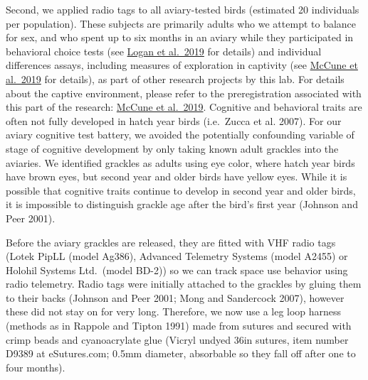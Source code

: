 \documentclass[
]{article}
\begin{document}
Second, we applied radio tags to all aviary-tested birds (estimated 20
individuals per population). These subjects are primarily adults who we
attempt to balance for sex, and who spent up to six months in an aviary
while they participated in behavioral choice tests (see
\href{http://corinalogan.com/Preregistrations/g_flexmanip.html}{Logan et
al.~2019} for details) and individual differences assays, including
measures of exploration in captivity (see
\href{http://corinalogan.com/Preregistrations/g_exploration.html}{McCune
et al.~2019} for details), as part of other research projects by this
lab. For details about the captive environment, please refer to the
preregistration associated with this part of the research:
\href{http://corinalogan.com/Preregistrations/g_exploration.html}{McCune
et al.~2019}. Cognitive and behavioral traits are often not fully
developed in hatch year birds (i.e.~Zucca et al. 2007). For our aviary
cognitive test battery, we avoided the potentially confounding variable
of stage of cognitive development by only taking known adult grackles
into the aviaries. We identified grackles as adults using eye color,
where hatch year birds have brown eyes, but second year and older birds
have yellow eyes. While it is possible that cognitive traits continue to
develop in second year and older birds, it is impossible to distinguish
grackle age after the bird's first year (Johnson and Peer 2001).

Before the aviary grackles are released, they are fitted with VHF radio
tags (Lotek PipLL (model Ag386), Advanced Telemetry Systems (model
A2455) or Holohil Systems Ltd.~(model BD-2)) so we can track space use
behavior using radio telemetry. Radio tags were initially attached to
the grackles by gluing them to their backs (Johnson and Peer 2001; Mong
and Sandercock 2007), however these did not stay on for very long.
Therefore, we now use a leg loop harness (methods as in Rappole and
Tipton 1991) made from sutures and secured with crimp beads and
cyanoacrylate glue (Vicryl undyed 36in sutures, item number D9389 at
eSutures.com; 0.5mm diameter, absorbable so they fall off after one to
four months).
\end{document}
